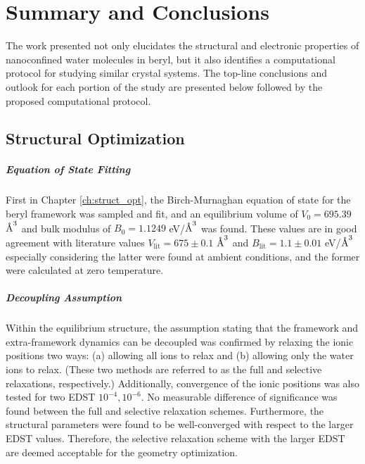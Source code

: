 
\chapter{Summary and Conclusions}
\label{chap:conclusions}


The work presented not only elucidates the structural and electronic properties of nanoconfined water molecules in beryl, but it also identifies a computational protocol for studying similar crystal systems. The top-line conclusions and outlook for each portion of the study are presented below followed by the proposed computational protocol.

\section{Structural Optimization} 

\paragraph{Equation of State Fitting} First in Chapter \ref{ch:struct_opt}, the Birch-Murnaghan equation of state for the beryl framework was sampled and fit, and an equilibrium volume of $V_0= 695.39$ $\text{\normalfont\AA}^3$ and bulk modulus of $B_0 = 1.1249$ eV/$\text{\normalfont\AA}^3$ was found. These values are in good agreement with literature values  \textemdash  $V_\text{lit} = 675\pm0.1$ $\text{\normalfont\AA}^3$ and $B_\text{lit} = 1.1\pm0.01$ eV/$\text{\normalfont\AA}^3$   \textemdash  especially considering the latter were found at ambient conditions, and the former were calculated at zero temperature. 

\paragraph{Decoupling Assumption} Within the equilibrium structure, the assumption stating that the framework and extra-framework dynamics can be decoupled was confirmed by relaxing the ionic positions two ways: (a) allowing all ions to relax and (b) allowing only the water ions to relax. (These two methods are referred to as the full and selective relaxations, respectively.) Additionally, convergence of the ionic positions was also tested for two EDST $10^{-4},10^{-6}$. No measurable difference of significance was found between the full and selective relaxation schemes. Furthermore, the structural parameters were found to be well-converged with respect to the larger EDST values. Therefore, the selective relaxation scheme with the larger EDST are deemed acceptable for the geometry optimization.

